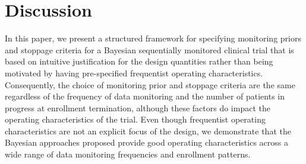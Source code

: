 \documentclass[AMA,STIX1COL,doublespace]{WileyNJD-v2}
\begin{document}
\section{Discussion}
In this paper, we present a structured framework for specifying monitoring priors and stoppage criteria for a Bayesian sequentially monitored clinical trial that is based on intuitive justification for the design quantities rather than being motivated by having pre-specified frequentist operating characteristics.
%
%
%
%
%
Consequently, the choice of monitoring prior and stoppage criteria are the same regardless of the frequency of data monitoring and the number of patients in progress at enrollment termination, although these factors do impact the operating characteristics of the trial.
%
Even though frequentist operating characteristics are not an explicit focus of the design, we demonstrate that the Bayesian approaches proposed provide good operating characteristics across a wide range of data monitoring frequencies and enrollment patterns.
\end{document}
